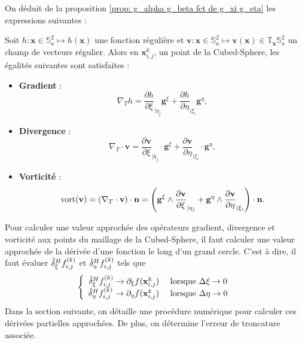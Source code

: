 On déduit de la proposition \ref{prop: g_alpha g_beta fct de g_xi g_eta} les expressions suivantes :

\begin{theoreme}
Soit $h : \mathbf{x} \in \mathbb{S}_a^2 \mapsto h(\mathbf{x})$ une fonction régulière et $\mathbf{v} : \mathbf{x} \in \mathbb{S}_a^2 \mapsto \mathbf{v}(\mathbf{x}) \in \mathbb{T}_{\mathbf{x}} \mathbb{S}_a^2$ un champ de vecteurs régulier. Alors en $\mathbf{x}_{i,j}^k$, un point de la Cubed-Sphere, les égalités suivantes sont satisfaites :
\begin{itemize}
\item \textbf{Gradient} :
\begin{equation}
\nabla_T h = \dfrac{\partial h}{\partial \xi}_{|\eta_j} \mathbf{g}^{\xi} + \dfrac{\partial h}{\partial \eta}_{|\xi_i} \mathbf{g}^{\eta},
\end{equation}

\item \textbf{Divergence} :
\begin{equation}
\nabla_T \cdot \mathbf{v} = \dfrac{\partial \mathbf{v}}{\partial \xi}_{|\eta_j} \cdot \mathbf{g}^{\xi} + \dfrac{\partial \mathbf{v}}{\partial \eta}_{|\xi_i} \cdot \mathbf{g}^{\eta},
\label{eq:divergence_v1}
\end{equation}

\item \textbf{Vorticité} :
\begin{equation}
\text{vort}( \mathbf{v} ) = \left( \nabla_T \cdot \mathbf{v} \right) \cdot \mathbf{n} =  \left( \mathbf{g}^{\xi} \wedge \dfrac{\partial \mathbf{v}}{\partial \xi}_{|\eta_j} + \mathbf{g}^{\eta} \wedge \dfrac{\partial \mathbf{v}}{\partial \eta}_{|\xi_i} \right) \cdot \mathbf{n}.
\end{equation}
\end{itemize} 
\end{theoreme}

Pour calculer une valeur approchée des opérateurs gradient, divergence et vorticité aux points du maillage de la Cubed-Sphere, il faut calculer une valeur approchée de la dérivée d'une fonction le long d'un grand cercle. C'est à dire, il faut évaluer $\tilde{\delta}^H_{\xi} f_{i,j}^{(k)}$ et $\tilde{\delta}^H_{\eta} f_{i,j}^{(k)}$ tels que 
\begin{equation}
\left\lbrace
\begin{array}{rl}
\tilde{\delta}^H_{\xi} f_{i,j}^{(k)} \rightarrow \partial_{\xi} f ( \mathbf{x}_{i,j}^k) & \text{ lorsque } \Delta \xi \rightarrow 0\\
\tilde{\delta}^H_{\eta} f_{i,j}^{(k)} \rightarrow \partial_{\eta} f ( \mathbf{x}_{i,j}^k) & \text{ lorsque } \Delta \eta \rightarrow 0
\end{array}
\right.
\end{equation}
Dans la section suivante, on détaille une procédure numérique pour calculer ces dérivées partielles approchées. De plus, on détermine l'erreur de troncature associée.










